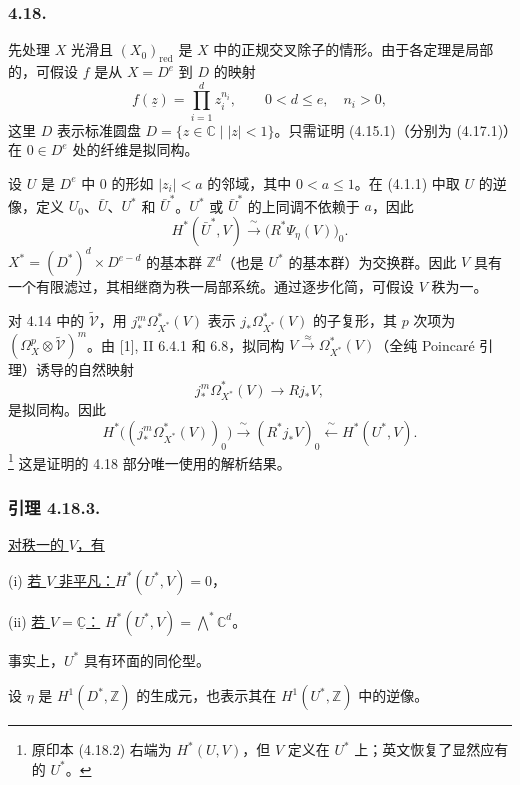 \subsubsection*{4.18.}
先处理 $X$ 光滑且 $(X_0)_{\mathrm{red}}$ 是 $X$ 中的正规交叉除子的情形。由于各定理是局部的，可假设 $f$ 是从 $X=D^e$ 到 $D$ 的映射
\[
f(\underline z)=\prod_{i=1}^d z_i^{n_i},
\qquad 0<d\leq e,\quad n_i>0,
\]
这里 $D$ 表示标准圆盘 $D=\{z\in\mathbb C\mid |z|<1\}$。只需证明 (4.15.1)（分别为 (4.17.1)）在 $0\in D^e$ 处的纤维是拟同构。

设 $U$ 是 $D^e$ 中 $0$ 的形如 $|z_i|<a$ 的邻域，其中 $0<a\leq1$。在 (4.1.1) 中取 $U$ 的逆像，定义 $U_0$、$\bar U$、$U^*$ 和 $\bar U^*$。$U^*$ 或 $\bar U^*$ 的上同调不依赖于 $a$，因此
\[
H^*(\bar U^*,V)\xrightarrow{\ \sim\ }
  \bigl(R^*\Psi_\eta(V)\bigr)_0.
\]
$X^*=(D^*)^d\times D^{e-d}$ 的基本群 $\mathbb Z^d$（也是 $U^*$ 的基本群）为交换群。因此 $V$ 具有一个有限滤过，其相继商为秩一局部系统。通过逐步化简，可假设 $V$ 秩为一。

对 4.14 中的 $\widetilde{\mathcal V}$，用 $j_*^m\Omega_{X^*}^*(V)$ 表示 $j_*\Omega_{X^*}^*(V)$ 的子复形，其 $p$ 次项为 $(\Omega_X^p\otimes\widetilde{\mathcal V})^m$。由 [1], II 6.4.1 和 6.8，拟同构 $V\xrightarrow{\ \approx\ }\Omega_{X^*}^*(V)$（全纯 Poincaré 引理）诱导的自然映射
\begin{equation}\tag{4.18.1}
j_*^m\Omega_{X^*}^*(V)\longrightarrow Rj_*V,
\end{equation}
是拟同构。因此
\begin{equation}\tag{4.18.2}
H^*\bigl((j_*^m\Omega_{X^*}^*(V))_0\bigr)
 \xrightarrow{\ \sim\ }(R^*j_*V)_0
 \xleftarrow{\ \sim\ }H^*(U^*,V).
\end{equation}
\footnote{原印本 (4.18.2) 右端为 $H^*(U,V)$，但 $V$ 定义在 $U^*$ 上；英文恢复了显然应有的 $U^*$。}
这是证明的 4.18 部分唯一使用的解析结果。

\subsubsection*{引理 4.18.3.}
\underline{对秩一的 $V$，有}

\noindent\textup{(i)}\qquad
\uline{若 $V$ 非平凡：}\quad $H^*(U^*,V)=0$，

\medskip
\noindent\textup{(ii)}\qquad
\uline{若 $V=\underline{\mathbb C}$：}\quad
$H^*(U^*,V)=\bigwedge\nolimits^*\mathbb C^d$。

事实上，$U^*$ 具有环面的同伦型。

设 $\eta$ 是 $H^1(D^*,\mathbb Z)$ 的生成元，也表示其在 $H^1(U^*,\mathbb Z)$ 中的逆像。

